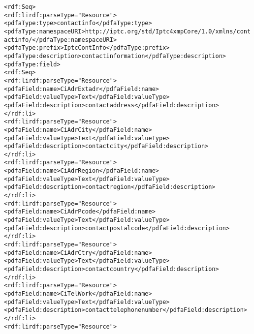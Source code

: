 \begin{alltt}
                    <rdf:Seq>
                      <rdf:li rdf:parseType="Resource">
                        <pdfaType:type>contactinfo</pdfaType:type>
                        <pdfaType:namespaceURI>http://iptc.org/std/Iptc4xmpCore/1.0/xmlns/contactinfo/</pdfaType:namespaceURI>
                        <pdfaType:prefix>IptcContInfo</pdfaType:prefix>
                        <pdfaType:description>contact information</pdfaType:description>
                        <pdfaType:field>
                          <rdf:Seq>
                            <rdf:li rdf:parseType="Resource">
                              <pdfaField:name>CiAdrExtadr</pdfaField:name>
                              <pdfaField:valueType>Text</pdfaField:valueType>
                              <pdfaField:description>contact address</pdfaField:description>
                            </rdf:li>
                            <rdf:li rdf:parseType="Resource">
                              <pdfaField:name>CiAdrCity</pdfaField:name>
                              <pdfaField:valueType>Text</pdfaField:valueType>
                              <pdfaField:description>contact city</pdfaField:description>
                            </rdf:li>
                            <rdf:li rdf:parseType="Resource">
                              <pdfaField:name>CiAdrRegion</pdfaField:name>
                              <pdfaField:valueType>Text</pdfaField:valueType>
                              <pdfaField:description>contact region</pdfaField:description>
                            </rdf:li>
                            <rdf:li rdf:parseType="Resource">
                              <pdfaField:name>CiAdrPcode</pdfaField:name>
                              <pdfaField:valueType>Text</pdfaField:valueType>
                              <pdfaField:description>contact postal code</pdfaField:description>
                            </rdf:li>
                            <rdf:li rdf:parseType="Resource">
                              <pdfaField:name>CiAdrCtry</pdfaField:name>
                              <pdfaField:valueType>Text</pdfaField:valueType>
                              <pdfaField:description>contact country</pdfaField:description>
                            </rdf:li>
                            <rdf:li rdf:parseType="Resource">
                              <pdfaField:name>CiTelWork</pdfaField:name>
                              <pdfaField:valueType>Text</pdfaField:valueType>
                              <pdfaField:description>contact telephone number</pdfaField:description>
                            </rdf:li>
                            <rdf:li rdf:parseType="Resource">

\end{alltt}
